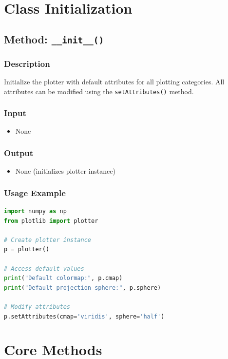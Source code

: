 \documentclass[11pt,a4paper]{article}
\begin{document}
\section{Class Initialization}

\subsection{Method: \texttt{\_\_init\_\_()}}

\subsubsection{Description}
Initialize the plotter with default attributes for all plotting categories. All attributes can be modified using the \texttt{setAttributes()} method.

\subsubsection{Input}
\begin{itemize}[leftmargin=*]
    \item None
\end{itemize}

\subsubsection{Output}
\begin{itemize}[leftmargin=*]
    \item None (initializes plotter instance)
\end{itemize}

\subsubsection{Usage Example}
\begin{lstlisting}[language=Python, caption=Basic initialization]
import numpy as np
from plotlib import plotter

# Create plotter instance
p = plotter()

# Access default values
print("Default colormap:", p.cmap)
print("Default projection sphere:", p.sphere)

# Modify attributes
p.setAttributes(cmap='viridis', sphere='half')
\end{lstlisting}

\section{Core Methods}
\end{document}
